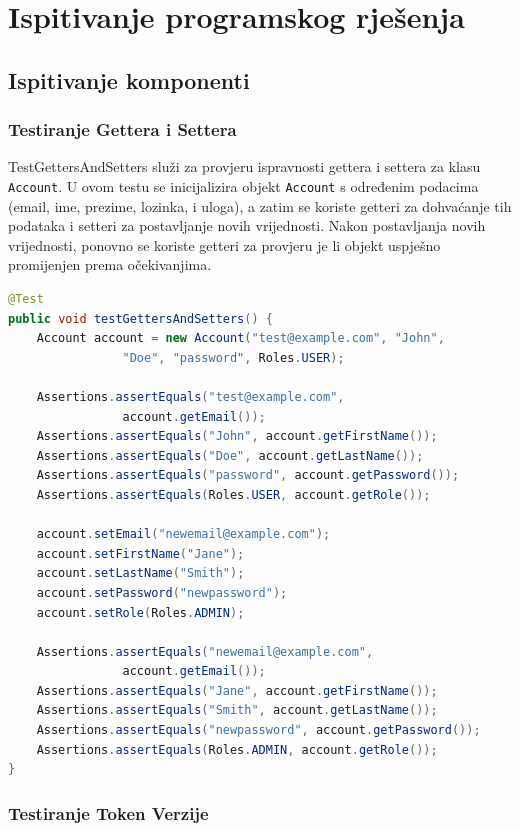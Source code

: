 			
			\eject 
		
	
		\section{Ispitivanje programskog rješenja}

			\subsection{Ispitivanje komponenti}
			
			\subsubsection{Testiranje Gettera i Settera}
			
			TestGettersAndSetters služi za provjeru ispravnosti gettera i settera za klasu \texttt{Account}. U ovom testu se inicijalizira objekt \texttt{Account} s određenim podacima (email, ime, prezime, lozinka, i uloga), a zatim se koriste getteri za dohvaćanje tih podataka i setteri za postavljanje novih vrijednosti. Nakon postavljanja novih vrijednosti, ponovno se koriste getteri za provjeru je li objekt uspješno promijenjen prema očekivanjima.
			
			\begin{lstlisting}[language=Java]
@Test
public void testGettersAndSetters() {
	Account account = new Account("test@example.com", "John", 
				"Doe", "password", Roles.USER);
	
	Assertions.assertEquals("test@example.com", 
				account.getEmail());
	Assertions.assertEquals("John", account.getFirstName());
	Assertions.assertEquals("Doe", account.getLastName());
	Assertions.assertEquals("password", account.getPassword());
	Assertions.assertEquals(Roles.USER, account.getRole());
	
	account.setEmail("newemail@example.com");
	account.setFirstName("Jane");
	account.setLastName("Smith");
	account.setPassword("newpassword");
	account.setRole(Roles.ADMIN);
	
	Assertions.assertEquals("newemail@example.com", 
				account.getEmail());
	Assertions.assertEquals("Jane", account.getFirstName());
	Assertions.assertEquals("Smith", account.getLastName());
	Assertions.assertEquals("newpassword", account.getPassword());
	Assertions.assertEquals(Roles.ADMIN, account.getRole());
}
			\end{lstlisting}
			
			\subsubsection{Testiranje Token Verzije}
			
